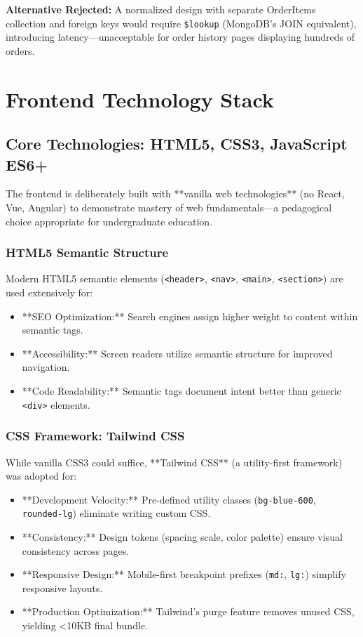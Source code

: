 \textbf{Alternative Rejected:} A normalized design with separate OrderItems collection and foreign keys would require \texttt{\$lookup} (MongoDB's JOIN equivalent), introducing latency—unacceptable for order history pages displaying hundreds of orders.

\section{Frontend Technology Stack}

\subsection{Core Technologies: HTML5, CSS3, JavaScript ES6+}

The frontend is deliberately built with **vanilla web technologies** (no React, Vue, Angular) to demonstrate mastery of web fundamentals—a pedagogical choice appropriate for undergraduate education.

\subsubsection{HTML5 Semantic Structure}

Modern HTML5 semantic elements (\texttt{<header>}, \texttt{<nav>}, \texttt{<main>}, \texttt{<section>}) are used extensively for:

\begin{itemize}
    \item **SEO Optimization:** Search engines assign higher weight to content within semantic tags.
    \item **Accessibility:** Screen readers utilize semantic structure for improved navigation.
    \item **Code Readability:** Semantic tags document intent better than generic \texttt{<div>} elements.
\end{itemize}

\subsubsection{CSS Framework: Tailwind CSS}

While vanilla CSS3 could suffice, **Tailwind CSS** (a utility-first framework) was adopted for:

\begin{itemize}
    \item **Development Velocity:** Pre-defined utility classes (\texttt{bg-blue-600}, \texttt{rounded-lg}) eliminate writing custom CSS.
    \item **Consistency:** Design tokens (spacing scale, color palette) ensure visual consistency across pages.
    \item **Responsive Design:** Mobile-first breakpoint prefixes (\texttt{md:}, \texttt{lg:}) simplify responsive layouts.
    \item **Production Optimization:** Tailwind's purge feature removes unused CSS, yielding \textless10KB final bundle.
\end{itemize}

